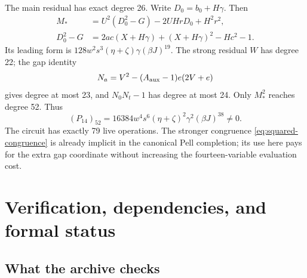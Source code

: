 \documentclass[11pt,a4paper]{article}
\theoremstyle{definition}\newtheorem{definition}[theorem]{Definition}
\theoremstyle{remark}\newtheorem{remark}[theorem]{Remark}
\begin{document}
The main residual has exact degree 26. Write $D_0=b_0+H\gamma$. Then
\begin{align*}
 M_*&=U^2(D_0^2-G)-2UHrD_0+H^2r^2,\\
 D_0^2-G&=2ac(X+H\gamma)+(X+H\gamma)^2-Hc^2-1.
\end{align*}
Its leading form is $128w^2s^3(\eta+\zeta)\gamma(\beta J)^{19}$.
The strong residual $W$ has degree 22; the gap identity
\[
 N_a=V^2-(A_{\rm aux}-1)e(2V+e)
\]
gives degree at most 23, and $N_0N_t-1$ has degree at most 24.
Only $M_*^2$ reaches degree 52. Thus
\[
 (P_{14})_{52}=16384w^4s^6(\eta+\zeta)^2\gamma^2(\beta J)^{38}\ne0.
\]
The circuit has exactly 79 live operations. The stronger congruence
\eqref{eq:squared-congruence} is already implicit in the canonical Pell
completion; its use here pays for the extra gap coordinate without
increasing the fourteen-variable evaluation cost.

\section{Verification, dependencies, and formal status}\label{sec:status}

\subsection{What the archive checks}
\end{document}
